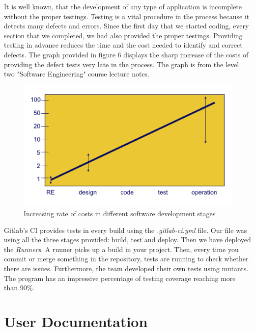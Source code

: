 \documentclass{l3proj}
\begin{document}
It is well known, that the development of any type of application is incomplete without the proper testings. Testing is a vital procedure in the process because it detects many defects and errors. Since the first day that we started coding, every section that we completed, we had also provided the proper testings. Providing testing in advance reduces the time and the cost needed to identify and correct defects. The graph provided in figure 6 displays the sharp increase of the costs of providing the defect tests very late in the process. The graph is from the level two "Software Engineering" course lecture notes.

\begin{figure}
  \centerline{\includegraphics[width=\textwidth, height=\textheight, keepaspectratio]{costOfErrors.png}}
  \caption{Increasing rate of costs in different software development stages }
\end{figure}

 Gitlab's CI provides tests in every build using the \textit{.gitlab-ci.yml} file. Our file was using all the three stages provided: build, test and deploy. Then we have deployed the \textit{Runners}. A runner picks up a build in your project. Then, every time you commit or merge something in the repository, tests are running to check whether there are issues. Furthermore, the team developed their own tests using mutants. The program has an impressive percentage of testing coverage reaching more than 90\%. 










\section{User Documentation}
\label{sec:user_doc}
\end{document}
